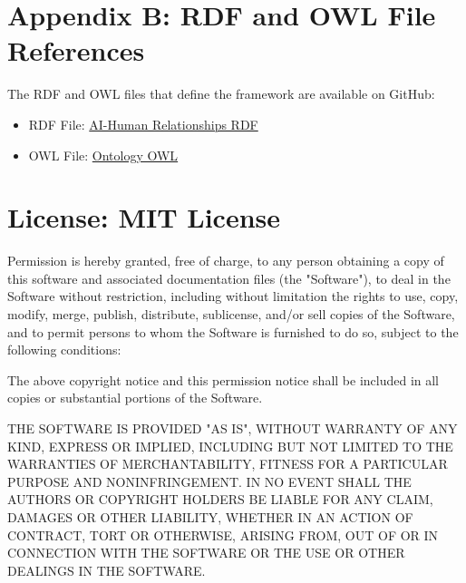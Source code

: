 \documentclass{article}
\begin{document}
\section*{Appendix B: RDF and OWL File References}

\noindent The RDF and OWL files that define the framework are available on GitHub:

\begin{itemize}
    \item RDF File: \href{https://github.com/sindoc/knowyourai-framework/blob/main/ai-human-relationships.rdf}{AI-Human Relationships RDF}
    \item OWL File: \href{https://github.com/sindoc/knowyourai-framework/blob/main/ontology.owl}{Ontology OWL}
\end{itemize}

\section*{License: MIT License}
Permission is hereby granted, free of charge, to any person obtaining a copy of this software and associated documentation files (the "Software"), to deal in the Software without restriction, including without limitation the rights to use, copy, modify, merge, publish, distribute, sublicense, and/or sell copies of the Software, and to permit persons to whom the Software is furnished to do so, subject to the following conditions:

The above copyright notice and this permission notice shall be included in all copies or substantial portions of the Software.

THE SOFTWARE IS PROVIDED "AS IS", WITHOUT WARRANTY OF ANY KIND, EXPRESS OR IMPLIED, INCLUDING BUT NOT LIMITED TO THE WARRANTIES OF MERCHANTABILITY, FITNESS FOR A PARTICULAR PURPOSE AND NONINFRINGEMENT. IN NO EVENT SHALL THE AUTHORS OR COPYRIGHT HOLDERS BE LIABLE FOR ANY CLAIM, DAMAGES OR OTHER LIABILITY, WHETHER IN AN ACTION OF CONTRACT, TORT OR OTHERWISE, ARISING FROM, OUT OF OR IN CONNECTION WITH THE SOFTWARE OR THE USE OR OTHER DEALINGS IN THE SOFTWARE.
\end{document}
